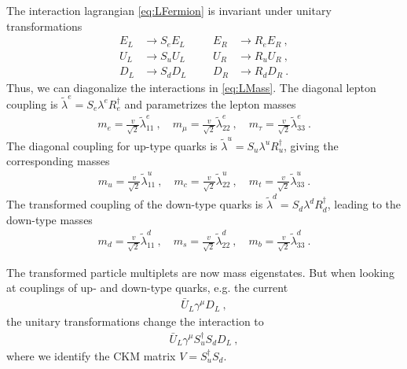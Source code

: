 The interaction lagrangian \eqref{eq:LFermion} is invariant under unitary transformations
\begin{align}
	E_L &\rightarrow S_eE_L && &E_R &\rightarrow R_eE_R \ , \\
	U_L &\rightarrow S_uU_L && &U_R &\rightarrow R_uU_R \ , \\
	D_L &\rightarrow S_dD_L && &D_R &\rightarrow R_dD_R \ .
\end{align}
Thus, we can diagonalize the interactions in \eqref{eq:LMass}. The diagonal lepton coupling is $\tilde{\lambda}^e = S_e\lambda^eR_e^\dagger$ and parametrizes the lepton masses
\begin{align}
	m_e = \frac{v}{\sqrt{2}}\tilde{\lambda}_{11}^e \ , \quad m_\mu = \frac{v}{\sqrt{2}}\tilde{\lambda}_{22}^e \ , \quad m_\tau = \frac{v}{\sqrt{2}}\tilde{\lambda}_{33}^e \ .
\end{align}
The diagonal coupling for up-type quarks is $\tilde{\lambda}^u = S_u\lambda^uR_u^\dagger$, giving the corresponding masses
\begin{align}
	m_u = \frac{v}{\sqrt{2}}\tilde{\lambda}_{11}^u \ , \quad m_c = \frac{v}{\sqrt{2}}\tilde{\lambda}_{22}^u \ , \quad m_t = \frac{v}{\sqrt{2}}\tilde{\lambda}_{33}^u \ .
\end{align}
The transformed coupling of the down-type quarks is $\tilde{\lambda}^d = S_d\lambda^dR_d^\dagger$, leading to the down-type masses
\begin{align}
	m_d = \frac{v}{\sqrt{2}}\tilde{\lambda}_{11}^d \ , \quad m_s = \frac{v}{\sqrt{2}}\tilde{\lambda}_{22}^d \ , \quad m_b = \frac{v}{\sqrt{2}}\tilde{\lambda}_{33}^d \ .
\end{align}


The transformed particle multiplets are now mass eigenstates. But when looking at couplings of up- and down-type quarks, e.g. the current
\begin{align}
	\bar{U}_L\gamma^\mu D_L \ ,
\end{align}
the unitary transformations change the interaction to
\begin{align}
	\bar{U}_L\gamma^\mu S_u^\dagger S_d D_L \ ,
\end{align}
where we identify the CKM matrix $V = S_u^\dagger S_d$.